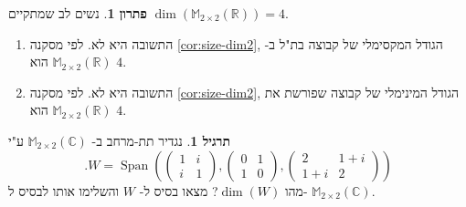 \documentclass[12pt]{report}
\theoremstyle{plain}
\theoremstyle{definition}
\newtheorem{exercise}{תרגיל}[chapter]
\newtheorem*{solution}{פתרון}
\newcommand{\R}{\mathbb{R}}
\newcommand{\C}{\mathbb{C}}
\newcommand{\M}{\mathbb{M}}
\newcommand{\0}{\mathbf{0}}
\DeclareMathOperator{\Span}{Span}
\begin{document}
\begin{solution}
נשים לב שמתקיים 
$\dim(\M_{2\times 2}(\R))=4$.

\begin{enumerate}[label=\alph*.]
\item 
התשובה היא לא. לפי מסקנה
\ref{cor:size-dim2},
הגודל המקסימלי של קבוצה בת"ל ב-
$\M_{2\times 2}(\R)$
הוא 
$4$.


\item 
התשובה היא לא. לפי מסקנה
\ref{cor:size-dim2},
הגודל המינימלי של קבוצה שפורשת את
$\M_{2\times 2}(\R)$
הוא 
$4$.


\end{enumerate}
\end{solution}

\begin{exercise}
נגדיר תת-מרחב ב-
$\M_{2\times 2}(\C)$
ע"י
$$
.W=\Span\left(\begin{pmatrix}
1 & i \\
i & 1
\end{pmatrix},\begin{pmatrix}
0 & 1 \\
1 & 0
\end{pmatrix}, \begin{pmatrix}
2 & 1+i \\
1+i & 2
\end{pmatrix}\right)
$$
מהו
$\dim(W)$?
מצאו בסיס ל-
$W$
והשלימו אותו
לבסיס ל-
$\M_{2\times 2}(\C)$.
\end{exercise}
\end{document}
